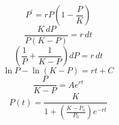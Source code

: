 \documentclass{article}
\begin{document}
\[
P^{\prime}=rP\left(1-\frac{P}{K}\right)
\]
\[
\frac{K\,dP}{P(K-P)}=r\,dt
\]
\[
\left(\frac{1}{P}+\frac{1}{K-P}\right)dP=r\,dt
\]
\[
\ln P-\ln(K-P)=rt+C
\]
\[
\frac{P}{K-P}=Ae^{rt}
\]
\[
P(t)=\frac{K}{1+\left(\frac{K-P_0}{P_0}\right)e^{-rt}}
\]
\end{document}
